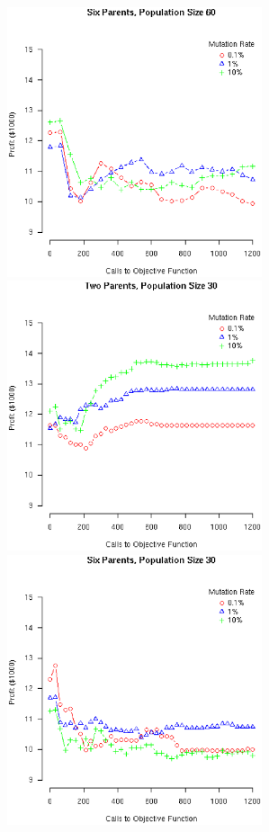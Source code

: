 \documentclass[12pt]{article}
\begin{document}
\begin{figure}[!ht]
\begin{minipage}[b]{0.5\linewidth}
  \end{minipage}
  \begin{minipage}[b]{0.5\linewidth}
    \includegraphics[width=7.5cm]{Gen6ParentsPop60.eps}
  \end{minipage}
  \begin{minipage}[b]{0.5\linewidth}
    \includegraphics[width=7.5cm]{Gen2ParentsPop30.eps}
  \end{minipage}
  \begin{minipage}[b]{0.5\linewidth}
    \includegraphics[width=7.5cm]{Gen6ParentsPop30.eps}
  \end{minipage}
\end{figure}
\end{document}

